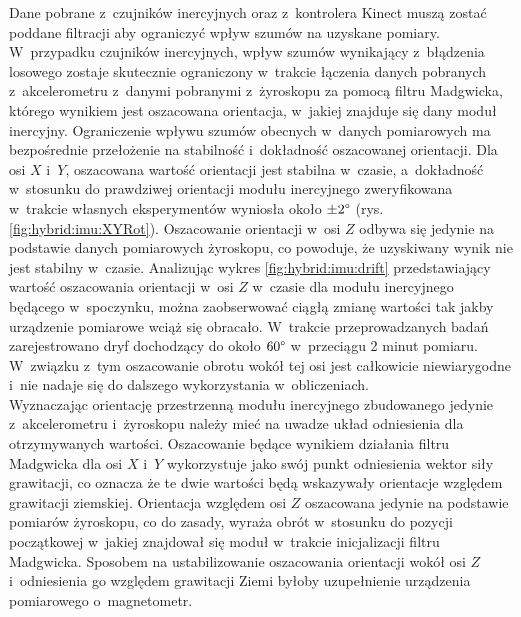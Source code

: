 Dane pobrane z~czujników inercyjnych oraz z~kontrolera Kinect muszą zostać poddane filtracji aby ograniczyć wpływ szumów na uzyskane pomiary. W~przypadku czujników inercyjnych, wpływ szumów wynikający z~błądzenia losowego zostaje skutecznie ograniczony w~trakcie łączenia danych pobranych z~akcelerometru z~danymi pobranymi z~żyroskopu za pomocą filtru Madgwicka, którego wynikiem jest oszacowana orientacja, w~jakiej znajduje się dany moduł inercyjny. Ograniczenie wpływu szumów obecnych w~danych pomiarowych ma bezpośrednie przełożenie na stabilność i~dokładność oszacowanej orientacji. Dla osi $X$ i~$Y$, oszacowana wartość orientacji jest stabilna w~czasie, a~dokładność w~stosunku do prawdziwej orientacji modułu inercyjnego zweryfikowana w~trakcie własnych eksperymentów wyniosła około $\pm 2\degree$ (rys. \ref{fig:hybrid:imu:XYRot}).
Oszacowanie orientacji w~osi $Z$ odbywa się jedynie na podstawie danych pomiarowych żyroskopu, co powoduje, że uzyskiwany wynik nie jest stabilny w~czasie. Analizując wykres \ref{fig:hybrid:imu:drift}
przedstawiający wartość oszacowania orientacji w~osi $Z$ w~czasie dla modułu inercyjnego będącego w~spoczynku, można zaobserwować ciągłą zmianę wartości tak jakby urządzenie pomiarowe wciąż się obracało. W~trakcie przeprowadzanych badań zarejestrowano dryf dochodzący do około $60\degree$ w~przeciągu 2 minut pomiaru. W~związku z~tym oszacowanie obrotu wokół tej osi jest całkowicie niewiarygodne i~nie nadaje się do dalszego wykorzystania w~obliczeniach. \\
Wyznaczając orientację przestrzenną modułu inercyjnego zbudowanego jedynie z~akcelerometru i~żyroskopu należy mieć na uwadze układ odniesienia dla otrzymywanych wartości. Oszacowanie będące wynikiem działania filtru Madgwicka dla osi $X$ i~$Y$ wykorzystuje jako swój punkt odniesienia wektor siły grawitacji, co oznacza że te dwie wartości będą wskazywały orientacje względem grawitacji ziemskiej. Orientacja względem osi $Z$ oszacowana jedynie na podstawie pomiarów żyroskopu, co do zasady, wyraża obrót w~stosunku do pozycji początkowej w~jakiej znajdował się moduł w~trakcie inicjalizacji filtru Madgwicka. Sposobem na ustabilizowanie oszacowania orientacji wokół osi $Z$ i~odniesienia go względem grawitacji Ziemi byłoby uzupełnienie urządzenia pomiarowego o~magnetometr. \\

